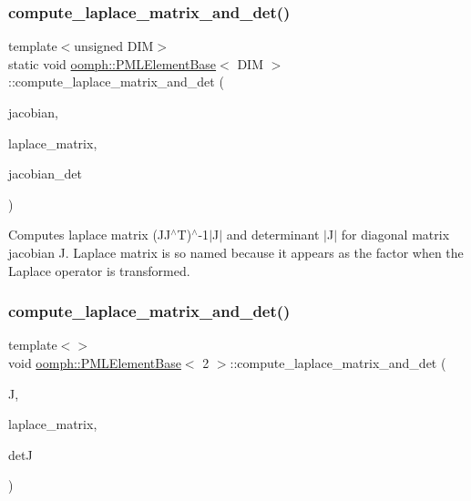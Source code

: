\subsubsection{\texorpdfstring{compute\+\_\+laplace\+\_\+matrix\+\_\+and\+\_\+det()}{compute\_laplace\_matrix\_and\_det()}\hspace{0.1cm}{\footnotesize\ttfamily [6/12]}}
{\footnotesize\ttfamily template$<$unsigned D\+IM$>$ \\
static void \hyperlink{classoomph_1_1PMLElementBase}{oomph\+::\+P\+M\+L\+Element\+Base}$<$ D\+IM $>$\+::compute\+\_\+laplace\+\_\+matrix\+\_\+and\+\_\+det (\begin{DoxyParamCaption}\item[{const \hyperlink{classoomph_1_1DiagonalComplexMatrix}{Diagonal\+Complex\+Matrix} \&}]{jacobian,  }\item[{\hyperlink{classoomph_1_1DiagonalComplexMatrix}{Diagonal\+Complex\+Matrix} \&}]{laplace\+\_\+matrix,  }\item[{std\+::complex$<$ double $>$ \&}]{jacobian\+\_\+det }\end{DoxyParamCaption})\hspace{0.3cm}{\ttfamily [static]}}



Computes laplace matrix (J\+J$^\wedge$T)$^\wedge$-\/1$\vert$\+J$\vert$ and determinant $\vert$\+J$\vert$ for diagonal matrix jacobian J. Laplace matrix is so named because it appears as the factor when the Laplace operator is transformed. 

\mbox{\label{classoomph_1_1PMLElementBase_a654f2ef095100243e53adbd6cbd28bb4}} 
\subsubsection{\texorpdfstring{compute\+\_\+laplace\+\_\+matrix\+\_\+and\+\_\+det()}{compute\_laplace\_matrix\_and\_det()}\hspace{0.1cm}{\footnotesize\ttfamily [7/12]}}
{\footnotesize\ttfamily template$<$$>$ \\
void \hyperlink{classoomph_1_1PMLElementBase}{oomph\+::\+P\+M\+L\+Element\+Base}$<$ 2 $>$\+::compute\+\_\+laplace\+\_\+matrix\+\_\+and\+\_\+det (\begin{DoxyParamCaption}\item[{const \hyperlink{classoomph_1_1DiagonalComplexMatrix}{Diagonal\+Complex\+Matrix} \&}]{J,  }\item[{\hyperlink{classoomph_1_1DiagonalComplexMatrix}{Diagonal\+Complex\+Matrix} \&}]{laplace\+\_\+matrix,  }\item[{std\+::complex$<$ double $>$ \&}]{detJ }\end{DoxyParamCaption})}



